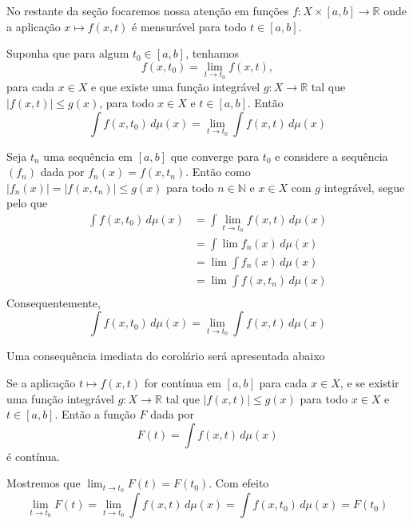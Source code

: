 \documentclass[a4paper, 11pt]{book}
\theoremstyle{definition}
\newcommand{\bN}{\mathbb{N}}
\newcommand{\bR}{\mathbb{R}}
\begin{document}
\footnotetext{$\limsup x_n \leqslant x \leqslant\liminf x_n$ para todo $n \in \bN$ $\implies$ $\lim x_n = x$}

No restante da seção focaremos nossa atenção em funções $f : X \times [a,b] \to \bR$ onde a aplicação $x \mapsto f(x,t)$ é mensurável para todo $t \in [a,b]$.

\begin{cbox}
    Suponha que para algum $t_0 \in [a,b]$, tenhamos
    \[
        f(x,t_0) = \lim_{t\to t_0} f(x,t),
    \]
    para cada $x \in X$ e que existe uma função integrável $g : X\to\bR$ tal que $|f(x,t)| \leqslant g(x)$, para todo $x \in X$ e $t \in [a,b]$.
    Então
    \[
        \int f(x,t_0) \, d\mu(x) = \lim_{t \to t_0} \int f(x,t) \, d\mu(x)
    \]
\end{cbox}
\begin{prf}
    Seja $t_n$ uma sequência em $[a,b]$ que converge para $t_0$ e considere a sequência $(f_n)$ dada por $f_n(x) = f(x,t_n)$. 
    Então como $|f_n(x)| = |f(x,t_n)| \leqslant g(x)$ para todo $n \in \bN$ e $x \in X$ com $g$ integrável, segue pelo  que
    \[
        \begin{aligned}
            \int f(x,t_0) \,d\mu(x) &= \int \lim_{t\to t_0} f(x,t) \, d\mu(x)\\
            &= \int \lim f_n(x) \,d\mu(x)\\
            &= \lim \int f_n(x) \,d\mu(x)\\
            &= \lim \int f(x,t_n) \, d\mu(x)\\
        \end{aligned}
    \]
    Consequentemente,
    \[
        \int f(x,t_0) \, d\mu(x) = \lim_{t \to t_0} \int f(x,t) \, d\mu(x)
    \]
\end{prf}

Uma consequência imediata do corolário será apresentada abaixo

\begin{cbox}
    Se a aplicação $t \mapsto f(x,t)$ for contínua em $[a,b]$ para cada $x \in X$, e se existir uma função integrável $g : X \to \bR$ tal que $|f(x,t)| \leqslant g(x)$ para todo $x \in X$ e $t \in [a,b]$.
    Então a função $F$ dada por
    \[
        F(t) = \int f(x,t) \,d\mu(x)
    \]
    é contínua.
\end{cbox}
\begin{prf}
    Mostremos que $\lim_{t \to t_0} F(t) = F(t_0)$.
    Com efeito
    \[
        \lim_{t \to t_0} F(t) = \lim_{t\to t_0} \int f(x,t) \,d\mu(x) = \int f(x,t_0) \,d\mu(x) = F(t_0)
    \]
\end{prf}
\end{document}
